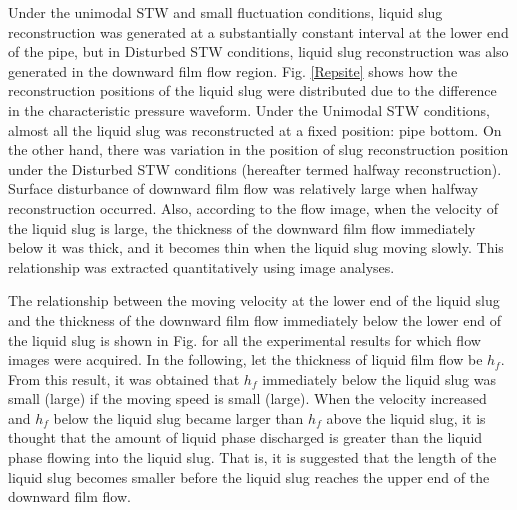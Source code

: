 \documentclass[aps,pre,preprint,groupedaddress,showkeys]{revtex4-2}
\begin{document}
Under the unimodal STW and small fluctuation conditions, liquid slug reconstruction was generated at a substantially constant interval at the lower end of the pipe, but in Disturbed STW conditions, liquid slug reconstruction was also generated in the downward film flow region.
Fig. \ref{Repsite} shows how the reconstruction positions of the liquid slug were distributed due to the difference in the characteristic pressure waveform.
Under the Unimodal STW conditions, almost all the liquid slug was reconstructed at a fixed position: pipe bottom.
On the other hand, there was variation in the position of slug reconstruction position under the Disturbed STW conditions (hereafter termed halfway reconstruction).
Surface disturbance of downward film flow was relatively large when halfway reconstruction occurred.
Also, according to the flow image, when the velocity of the liquid slug is large, the thickness of the downward film flow immediately below it was thick, and it becomes thin when the liquid slug moving slowly.
This relationship was extracted quantitatively using image analyses.

The relationship between the moving velocity at the lower end of the liquid slug and the thickness of the downward film flow immediately below the lower end of the liquid slug is shown in Fig.  for all the experimental results for which flow images were acquired.
In the following, let the thickness of liquid film flow be $h_f$.
From this result, it was obtained that $h_f$ immediately below the liquid slug was small (large) if the moving speed is small (large).
When the velocity increased and $h_f$ below the liquid slug became larger than $h_f$ above the liquid slug, it is thought that the amount of liquid phase discharged is greater than the liquid phase flowing into the liquid slug.
That is, it is suggested that the length of the liquid slug becomes smaller before the liquid slug reaches the upper end of the downward film flow.
\end{document}
